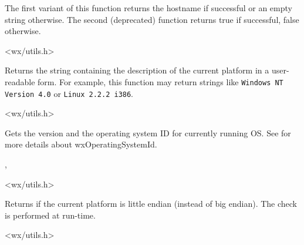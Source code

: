 The first variant of this function returns the hostname if successful or an
empty string otherwise. The second (deprecated) function returns true
if successful, false otherwise.




<wx/utils.h>


\label{wxgetosdescription}


Returns the string containing the description of the current platform in a
user-readable form. For example, this function may return strings like
{\tt Windows NT Version 4.0} or {\tt Linux 2.2.2 i386}.




<wx/utils.h>


\label{wxgetosversion}


Gets the version and the operating system ID for currently running OS.
See  for more details about wxOperatingSystemId.


,


<wx/utils.h>


\label{wxisplatformlittleendian}


Returns \true if the current platform is little endian (instead of big endian).
The check is performed at run-time.




<wx/utils.h>


\label{wxisplatform64bit}

